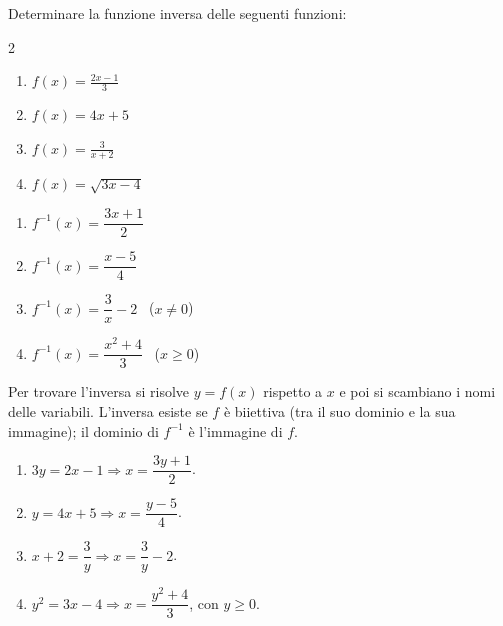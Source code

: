 \begin{question}[ID=4.4, subtitle={Funzione inversa — serie 4}, difficulty=media, tags={funzioni,inversa}]
Determinare la funzione inversa delle seguenti funzioni:

\begin{center}\begin{minipage}{0.92\linewidth}
\begin{multicols}{2}
\begin{enumerate}[leftmargin=3.2cm]
\item $f(x)=\frac{2x-1}{3}$
\item $f(x)=4x+5$
\item $f(x)=\frac{3}{x+2}$
\item $f(x)=\sqrt{3x-4}$
\end{enumerate}
\end{multicols}
\end{minipage}\end{center}
\begin{solution}
\begin{enumerate}
    \item $f^{-1}(x)=\dfrac{3x+1}{2}$
    \item $f^{-1}(x)=\dfrac{x-5}{4}$
    \item $f^{-1}(x)=\dfrac3x-2$ \ ($x\neq0$)
    \item $f^{-1}(x)=\dfrac{x^2+4}{3}$ \ ($x\geq0$)
\end{enumerate}
\end{solution}
\begin{explanation}
Per trovare l'inversa si risolve $y=f(x)$ rispetto a $x$ e poi si scambiano i nomi delle variabili. L'inversa esiste se $f$ è biiettiva (tra il suo dominio e la sua immagine); il dominio di $f^{-1}$ è l'immagine di $f$.
\begin{enumerate}
    \item $3y=2x-1 \Rightarrow x=\dfrac{3y+1}{2}$.
    \item $y=4x+5 \Rightarrow x=\dfrac{y-5}{4}$.
    \item $x+2=\dfrac3y \Rightarrow x=\dfrac3y-2$.
    \item $y^2=3x-4 \Rightarrow x=\dfrac{y^2+4}{3}$, con $y\geq0$.
\end{enumerate}
\end{explanation}

\end{question}


